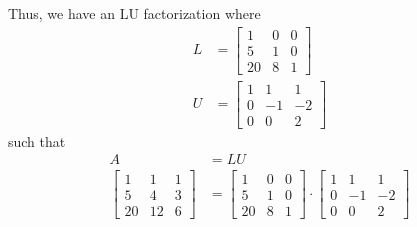 \documentclass[12pt, letterpaper]{article}
\begin{document}
Thus, we have an LU factorization where
\begin{align*}
L &= \begin{bmatrix}
1 & 0 & 0 \\
5 & 1 & 0 \\
20 & 8 & 1
\end{bmatrix} \\
U &= \begin{bmatrix}
1 & 1 & 1 \\
0 & -1 & -2 \\
0 & 0 & 2
\end{bmatrix}
\end{align*}
such that 
\begin{align*}
A &= LU \\
\begin{bmatrix}
1 & 1 & 1 \\
5 & 4 & 3 \\
20 & 12 & 6
\end{bmatrix}
&= \begin{bmatrix}
1 & 0 & 0 \\
5 & 1 & 0 \\
20 & 8 & 1
\end{bmatrix}
\cdot \begin{bmatrix}
1 & 1 & 1 \\
0 & -1 & -2 \\
0 & 0 & 2
\end{bmatrix}
\end{align*}
\end{document}
